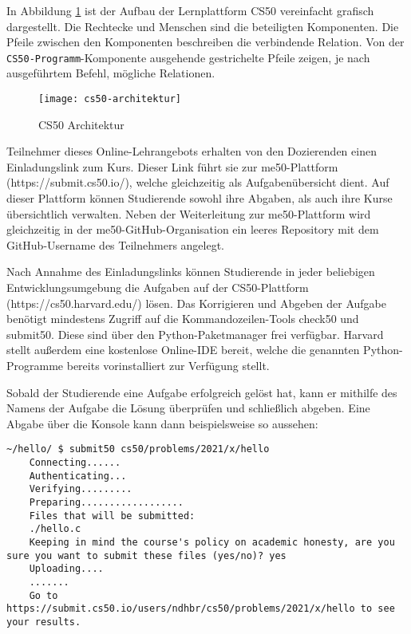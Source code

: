 In Abbildung \ref{fig:cs50-architektur} ist der Aufbau der Lernplattform CS50
vereinfacht grafisch dargestellt. Die Rechtecke und Menschen sind die
beteiligten Komponenten. Die Pfeile zwischen den Komponenten beschreiben die
verbindende Relation. Von der \texttt{CS50-Programm}-Komponente ausgehende
gestrichelte Pfeile zeigen, je nach ausgeführtem Befehl, mögliche Relationen.

\begin{figure}[h]
    \centering
    \texttt{[image: cs50-architektur]}
    \caption{CS50 Architektur}
    \label{fig:cs50-architektur}
\end{figure}

Teilnehmer dieses Online-Lehrangebots erhalten von den Dozierenden einen
Einladungslink zum Kurs. Dieser Link führt sie zur me50-Plattform
(https://submit.cs50.io/), welche gleichzeitig als Aufgabenübersicht dient.
Auf dieser Plattform können Studierende sowohl ihre Abgaben, als auch ihre Kurse
übersichtlich verwalten. Neben der Weiterleitung zur me50-Plattform wird
gleichzeitig in der me50-GitHub-Organisation ein leeres Repository mit dem
GitHub-Username des Teilnehmers angelegt.

Nach Annahme des Einladungslinks können Studierende in jeder beliebigen
Entwicklungsumgebung die Aufgaben auf der CS50-Plattform
(https://cs50.harvard.edu/) lösen. Das Korrigieren und Abgeben der Aufgabe
benötigt mindestens Zugriff auf die Kommandozeilen-Tools check50 und submit50.
Diese sind über den Python-Paketmanager frei verfügbar. Harvard stellt außerdem
eine kostenlose Online-IDE bereit, welche die genannten Python-Programme bereits
vorinstalliert zur Verfügung stellt.

Sobald der Studierende eine Aufgabe erfolgreich gelöst hat, kann er mithilfe des
Namens der Aufgabe die Lösung überprüfen und schließlich abgeben. Eine Abgabe
über die Konsole kann dann beispielsweise so aussehen:

\begin{lstlisting}[style=Bash]
    ~/hello/ $ submit50 cs50/problems/2021/x/hello
    Connecting......
    Authenticating...
    Verifying.........
    Preparing..................
    Files that will be submitted:
    ./hello.c
    Keeping in mind the course's policy on academic honesty, are you sure you want to submit these files (yes/no)? yes
    Uploading....
    .......
    Go to https://submit.cs50.io/users/ndhbr/cs50/problems/2021/x/hello to see your results.
\end{lstlisting}

